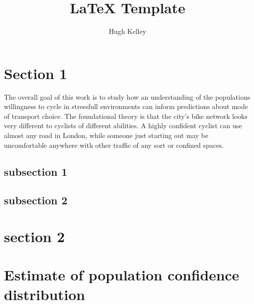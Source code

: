 \documentclass [12pt]{article}
\title{LaTeX Template\\\medskip }
\author{Hugh Kelley}
\begin{document}
\maketitle

\section{Section 1}

The overall goal of this work is to study how an understanding of the populations willingness to cycle in stressfull environments can inform predictions about mode of transport choice. The foundational theory is that the city's bike network looks very different to cyclists of different abilities. A highly confident cyclist can use almost any road in London, while someone just starting out may be uncomfortable anywhere with other traffic of any sort or confined spaces. 

\subsection{subsection 1}

\subsection{subsection 2}

\section{section 2}

\section{Estimate of population confidence distribution}

\nocite{*}


\end{document}
